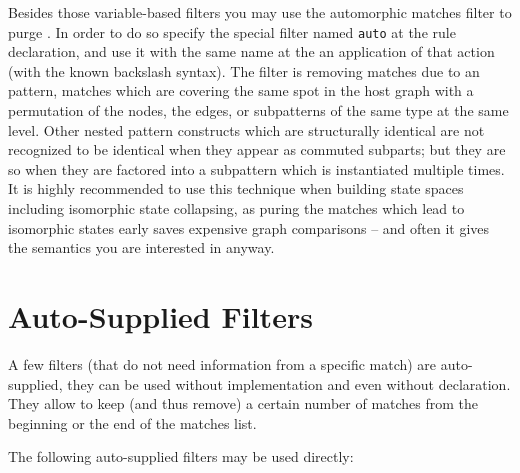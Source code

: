 Besides those variable-based filters you may use the automorphic matches filter to purge .
In order to do so specify the special filter named \texttt{auto} at the rule declaration, and use it with the same name at the an application of that action (with the known backslash syntax).
The filter is removing matches due to an  pattern, matches which are covering the same spot in the host graph with a permutation of the nodes, the edges, or subpatterns of the same type at the same level.
Other nested pattern constructs which are structurally identical are not recognized to be identical when they appear as commuted subparts; but they are so when they are factored into a subpattern which is instantiated multiple times.
It is highly recommended to use this  technique when building state spaces including isomorphic state collapsing, as puring the matches which lead to isomorphic states early saves expensive graph comparisons -- and often it gives the semantics you are interested in anyway.


\section{Auto-Supplied Filters}

A few filters (that do not need information from a specific match) are auto-supplied, they can be used without implementation and even without declaration. They allow to keep (and thus remove) a certain number of matches from the beginning or the end of the matches list.

The following auto-supplied filters may be used directly:

